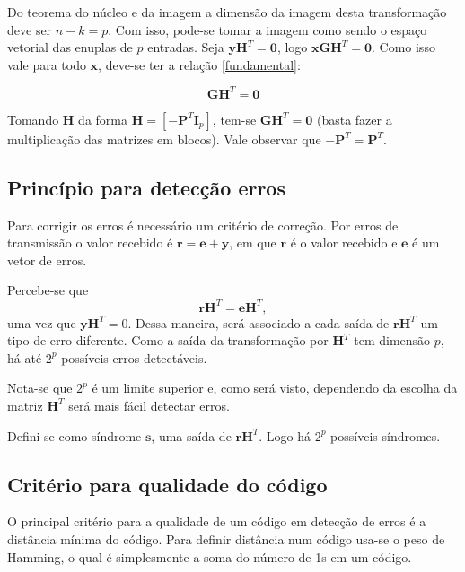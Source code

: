 Do teorema do núcleo e da imagem a dimensão da imagem desta transformação deve ser $n-k = p$. Com isso, pode-se tomar a imagem como sendo o espaço vetorial das enuplas de $p$ entradas. Seja $\textbf{y}\textbf{H}^T =\textbf{0}$, logo $\textbf{x}\textbf{G}\textbf{H}^T =\textbf{0}$. Como isso vale para todo $\textbf{x}$, deve-se ter a relação \ref{fundamental}:

\begin{equation}
	\textbf{G}\textbf{H}^T =\textbf{0}
	\label{eq:fundamental}
\end{equation}

Tomando $\textbf{H}$ da forma $\textbf{H} = [-\textbf{P}^T\textbf{I}_p]$, tem-se $\textbf{G}\textbf{H}^T = \textbf{0}$ (basta fazer a multiplicação das matrizes em blocos). Vale observar que $-\textbf{P}^T = \textbf{P}^T$.

\subsection{Princípio para detecção erros}

Para corrigir os erros é necessário um critério de correção. Por erros de transmissão o valor recebido é $\textbf{r} = \textbf{e}+\textbf{y}$, em que $\textbf{r}$ é o valor recebido e $\textbf{e}$ é um vetor de erros. 

Percebe-se que 
\begin{equation}
    \textbf{r}\textbf{H}^T = \textbf{e}\textbf{H}^T,
    \label{eq:decoding}
\end{equation}
uma vez que $\textbf{y}\textbf{H}^T = 0$. Dessa maneira, será associado a cada saída de $\textbf{r}\textbf{H}^T$ um tipo de erro diferente. Como a saída da transformação por $\textbf{H}^T$ tem dimensão $p$, há até $2^p$ possíveis erros detectáveis.

Nota-se que $2^p$ é um limite superior e, como será visto, dependendo da escolha da matriz $\textbf{H}^T$ será mais fácil detectar erros.

Defini-se como síndrome $\textbf{s}$, uma saída de $\textbf{r}\textbf{H}^T$. Logo há $2^p$ possíveis síndromes.

\subsection{Critério para qualidade do código}

O principal critério para a qualidade de um código em detecção de erros é a distância mínima do código. Para definir distância num código usa-se o peso de Hamming, o qual é simplesmente a soma do número de 1s em um código.

